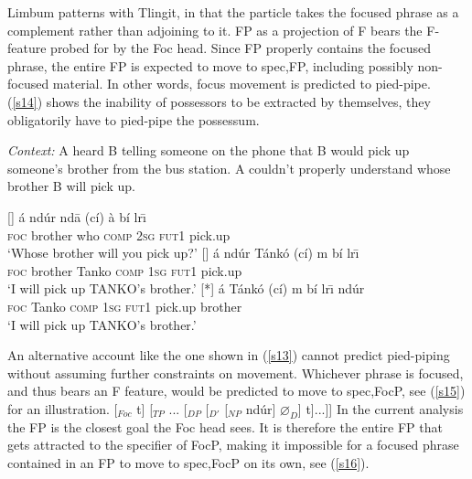 \documentclass[output=paper,
modfonts
]{langscibook}
\begin{document}
Limbum patterns with Tlingit, in that the particle takes the focused phrase as a complement rather than adjoining to it. FP as a projection of F bears the F-feature probed for by the Foc head. Since FP properly contains the focused phrase, the entire FP is expected to move to spec,FP, including possibly non-focused material. In other words, focus movement is predicted to pied-pipe. (\ref{s14}) shows the inability of possessors to be extracted by themselves, they obligatorily have to pied-pipe the possessum.
\begin{exe}
\ex \textit{Context:} A heard B telling someone on the phone that B would pick up someone's brother from the bus station. A couldn't properly understand whose brother B will pick up.\label{s14}
\begin{xlist}
[]{
\gll \'a nd\'ur nd\=a (c\'i) \`a b\'i lr\={\i} \\  
     \textsc{foc} brother who \textsc{comp} \textsc{2sg} \textsc{fut1} pick.up  \\ 
\glt `Whose brother will you pick up?'}
[]{
\gll \'a {nd\'ur} T\'ank\'o  (c\'i) m b\'i lr\={\i} \\  
     \textsc{foc} {brother} Tanko \textsc{comp} \textsc{1sg} \textsc{fut1} pick.up  \\ 
\glt `I will pick up TANKO's brother.'}
[*]{
\gll \'a {Tánkó} (c\'i) m b\'i lr\={\i} {nd\'ur} \\  
     \textsc{foc}  {Tanko} \textsc{comp} \textsc{1sg} \textsc{fut1} pick.up {brother}  \\ 
\glt `I will pick up TANKO's brother.'}
\end{xlist}
\end{exe}
An alternative account like the one shown in (\ref{s13}) cannot predict pied-piping without assuming further constraints on movement. Whichever phrase is focused, and thus bears an F feature, would be predicted to move to spec,FocP, see (\ref{s15}) for an illustration.
\ea *[... \'a\sub{1} [$_{FocP}$ [$_{DP}$ Tán\tikzmark{f}kó$_F$] [$_{Foc}$ t] [$_{TP}$ ... [$_{DP}$ [$_{D'}$ [$_{NP}$ nd\'ur] $\varnothing_D$] t]...]]
	 \label{s15}
\z
In the current analysis the FP is the closest goal the Foc head sees. It is therefore the entire FP that gets attracted to the specifier of FocP, making it impossible for a focused phrase contained in an FP to move to spec,FocP on its own, see (\ref{s16}).
\end{document}
